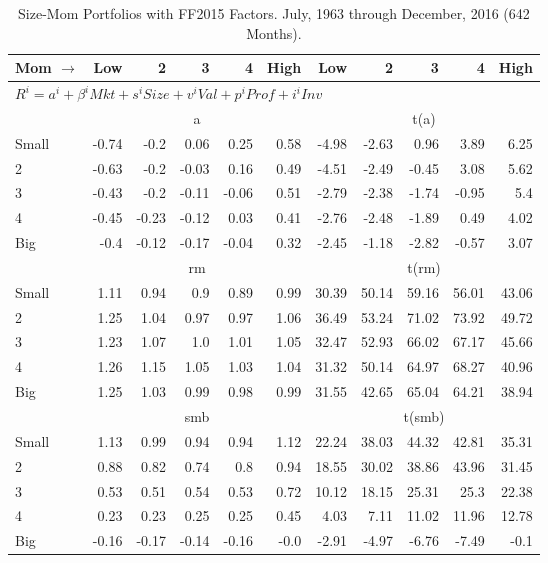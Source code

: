
\begin{table}[!ht]
\centering
\caption{Size-Mom Portfolios with FF2015 Factors. \footnotesize{July, 1963 through December, 2016 (642 Months).}}
\begin{tabular}{lrrrrrrrrrr}
  \toprule
  Mom $\rightarrow$ & Low & 2 & 3 & 4 & High & Low & 2 & 3 & 4 & High \\ 
  \toprule
  \multicolumn{9}{l}{$R^i=a^i+\beta^iMkt+s^iSize+v^iVal+p^iProf+i^iInv$} \\

  

      & \multicolumn{5}{c}{a} & \multicolumn{5}{c}{t(a)} \\
    \cmidrule(r){2-6} \cmidrule(r){7-11}
      Small  & -0.74  & -0.2  & 0.06  & 0.25  & 0.58   & -4.98  & -2.63  & 0.96  & 3.89  & 6.25  \\
          2  & -0.63  & -0.2  & -0.03  & 0.16  & 0.49   & -4.51  & -2.49  & -0.45  & 3.08  & 5.62  \\
          3  & -0.43  & -0.2  & -0.11  & -0.06  & 0.51   & -2.79  & -2.38  & -1.74  & -0.95  & 5.4  \\
          4  & -0.45  & -0.23  & -0.12  & 0.03  & 0.41   & -2.76  & -2.48  & -1.89  & 0.49  & 4.02  \\
      Big    & -0.4  & -0.12  & -0.17  & -0.04  & 0.32   & -2.45  & -1.18  & -2.82  & -0.57  & 3.07  \\

  

      & \multicolumn{5}{c}{rm} & \multicolumn{5}{c}{t(rm)} \\
    \cmidrule(r){2-6} \cmidrule(r){7-11}
      Small  & 1.11  & 0.94  & 0.9  & 0.89  & 0.99   & 30.39  & 50.14  & 59.16  & 56.01  & 43.06  \\
          2  & 1.25  & 1.04  & 0.97  & 0.97  & 1.06   & 36.49  & 53.24  & 71.02  & 73.92  & 49.72  \\
          3  & 1.23  & 1.07  & 1.0  & 1.01  & 1.05   & 32.47  & 52.93  & 66.02  & 67.17  & 45.66  \\
          4  & 1.26  & 1.15  & 1.05  & 1.03  & 1.04   & 31.32  & 50.14  & 64.97  & 68.27  & 40.96  \\
      Big    & 1.25  & 1.03  & 0.99  & 0.98  & 0.99   & 31.55  & 42.65  & 65.04  & 64.21  & 38.94  \\

  

      & \multicolumn{5}{c}{smb} & \multicolumn{5}{c}{t(smb)} \\
    \cmidrule(r){2-6} \cmidrule(r){7-11}
      Small  & 1.13  & 0.99  & 0.94  & 0.94  & 1.12   & 22.24  & 38.03  & 44.32  & 42.81  & 35.31  \\
          2  & 0.88  & 0.82  & 0.74  & 0.8  & 0.94   & 18.55  & 30.02  & 38.86  & 43.96  & 31.45  \\
          3  & 0.53  & 0.51  & 0.54  & 0.53  & 0.72   & 10.12  & 18.15  & 25.31  & 25.3  & 22.38  \\
          4  & 0.23  & 0.23  & 0.25  & 0.25  & 0.45   & 4.03  & 7.11  & 11.02  & 11.96  & 12.78  \\
      Big    & -0.16  & -0.17  & -0.14  & -0.16  & -0.0   & -2.91  & -4.97  & -6.76  & -7.49  & -0.1  \\


\end{tabular}
\end{table}
